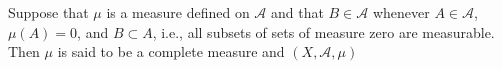 Suppose that $\mu$ is a measure defined on $\mathcal{A}$ and that $B \in \mathcal{A}$ whenever $A \in \mathcal{A}$, $\mu(A) = 0$, and $B \subset A$, i.e., all subsets of sets of measure zero are measurable. Then $\mu$ is said to be a complete measure and $(X, \mathcal{A}, \mu)$